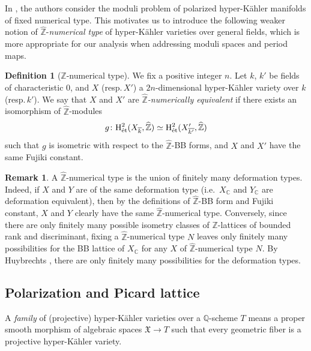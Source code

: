 \documentclass[11pt,reqno,oneside]{amsart}
\numberwithin{equation}{section}
\theoremstyle{definition}
\newtheorem{definition}[theorem]{Definition}
\newtheorem{remark}[theorem]{Remark}
\DeclareMathOperator{\et}{\Acute{e}t}
\newcommand\rH{\mathrm{H}}
\newcommand{\CC}{\mathbb{C}}
\newcommand{\QQ}{\mathbb{Q}}
\newcommand{\ZZ}{\mathbb{Z}}
\begin{document}
In \cite{GHS10}, the authors consider the moduli problem of polarized hyper-Kähler manifolds of fixed numerical type. This motivates us to introduce the following weaker notion of $\widehat{\ZZ}$-\textit{numerical type} of hyper-Kähler varieties over general fields, which is more appropriate for our analysis when addressing moduli spaces and period maps.

 \begin{definition}[$\widehat{\ZZ}$-numerical type]
We fix a positive integer $n$.
Let $k$, $k'$ be fields of characteristic $0$, and $X$ (resp.\,$X'$) a $2n$-dimensional hyper-Kähler variety over $k$ (resp.\,$k'$).
We say that $X$ and $X'$ are \emph{$\widehat{\ZZ}$-numerically equivalent} if there exists an isomorphism of $\widehat{\ZZ}$-modules
\[
g\colon
\rH^{2}_{\et}(X_{\overline{k}},\widehat{\ZZ}) \simeq \rH^{2}_{\et} (X'_{\overline{k'}}, \widehat{\ZZ})
\]
such that 
$g$ is isometric with respect to the $\widehat{\ZZ}$-BB forms, and $X$ and $X'$ have the same Fujiki constant.
\end{definition}


\begin{remark}
\label{remnumdef}
A $\widehat{\ZZ}$-numerical type is the union of finitely many deformation types. 
Indeed, if $X$ and $Y$ are of the same deformation type (i.e.~$X_\CC$ and $Y_\CC$ are deformation equivalent), then by the definitions of $\widehat{\ZZ}$-BB form and Fujiki constant, $X$ and $Y$ clearly have the same $\widehat{\ZZ}$-numerical type. Conversely, since there are only finitely many possible isometry classes of $\ZZ$-lattices of bounded rank and discriminant, fixing a $\widehat{\ZZ}$-numerical type $N$ leaves only finitely many possibilities for the BB lattice of $X_\CC$ for any $X$ of $\widehat{\ZZ}$-numerical type $N$. By Huybrechts \cite[Theorem 4.3]{Hu03}, there are only finitely many possibilities for the deformation types.
\end{remark}






\subsection{Polarization and Picard lattice} 
\label{subsec:Polarization}
A \textit{family} of (projective) hyper-Kähler varieties over a $\QQ$-scheme $T$ means a proper smooth morphism of algebraic spaces $\mathfrak{X}\to T$ such that every geometric fiber is a projective hyper-Kähler variety. 
\end{document}
